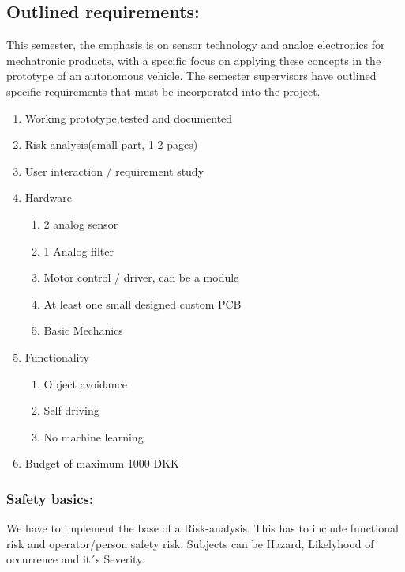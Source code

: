 \documentclass[../report.tex]{subfiles}
\begin{document}
\subsection{Outlined requirements:}
This semester, the emphasis is on sensor technology and analog electronics for
mechatronic products, with a specific focus on applying these concepts in the
prototype of an autonomous vehicle. The semester supervisors have outlined
specific requirements that must be incorporated into the project.
\begin{enumerate}
    \item Working prototype,tested and documented
    \item Risk analysis(small part, 1-2 pages)
    \item User interaction / requirement study
    \item Hardware\begin{enumerate}
        \item 2 analog sensor
        \item 1 Analog filter
        \item Motor control / driver, can be a module
        \item At least one small designed custom PCB
        \item Basic Mechanics
    \end{enumerate}
    \item Functionality\begin{enumerate}
        \item Object avoidance
        \item Self driving
        \item No machine learning
    \end{enumerate}
    \item Budget of maximum 1000 DKK
\end{enumerate}
\subsubsection{Safety basics:}
We have to implement the base of a Risk-analysis.%
This has to include functional risk and operator/person safety risk. Subjects can be Hazard, Likelyhood
of occurrence and it´s Severity.
\end{document}
